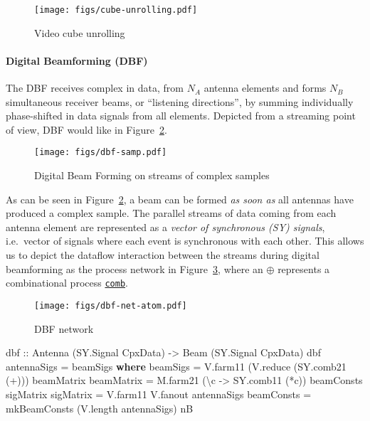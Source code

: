\documentclass[
  a4paper,
]{article}
\newenvironment{Shaded}{}{}
\newcommand{\DataTypeTok}[1]{\textcolor[rgb]{0.56,0.13,0.00}{#1}}
\newcommand{\FunctionTok}[1]{\textcolor[rgb]{0.02,0.16,0.49}{#1}}
\newcommand{\KeywordTok}[1]{\textcolor[rgb]{0.00,0.44,0.13}{\textbf{#1}}}
\newcommand{\NormalTok}[1]{#1}
\newcommand{\OtherTok}[1]{\textcolor[rgb]{0.00,0.44,0.13}{#1}}
\let\oldparagraph\paragraph
\renewcommand{\paragraph}[1]{\oldparagraph{#1}\mbox{}}
\begin{document}
\begin{figure}
\hypertarget{fig:cube-unrolling}{%
\centering
\texttt{[image: figs/cube-unrolling.pdf]}
\caption{Video cube unrolling}\label{fig:cube-unrolling}
}
\end{figure}

\hypertarget{sec:dbf-atom-net}{%
\paragraph{Digital Beamforming (DBF)}\label{sec:dbf-atom-net}}

The DBF receives complex in data, from \(N_A\) antenna elements and
forms \(N_B\) simultaneous receiver beams, or ``listening directions'',
by summing individually phase-shifted in data signals from all elements.
Depicted from a streaming point of view, DBF would like in
Figure~\ref{fig:dbf-samp}.

\begin{figure}
\hypertarget{fig:dbf-samp}{%
\centering
\texttt{[image: figs/dbf-samp.pdf]}
\caption{Digital Beam Forming on streams of complex
samples}\label{fig:dbf-samp}
}
\end{figure}

As can be seen in Figure~\ref{fig:dbf-samp}, a beam can be formed
\emph{as soon as} all antennas have produced a complex sample. The
parallel streams of data coming from each antenna element are
represented as a \emph{vector of synchronous (SY) signals}, i.e.~vector
of signals where each event is synchronous with each other. This allows
us to depict the dataflow interaction between the streams during digital
beamforming as the process network in Figure~\ref{fig:dbf-net-atom},
where an \(\oplus\) represents a combinational process
\href{https://forsyde.github.io/forsyde-atom/api/ForSyDe-Atom-MoC.html\#v:comb22}{\texttt{comb}}.

\begin{figure}
\hypertarget{fig:dbf-net-atom}{%
\centering
\texttt{[image: figs/dbf-net-atom.pdf]}
\caption{DBF network}\label{fig:dbf-net-atom}
}
\end{figure}

\begin{Shaded}
\begin{Highlighting}[numbers=left,,firstnumber=153,]
\OtherTok{dbf ::} \DataTypeTok{Antenna}\NormalTok{ (}\DataTypeTok{SY.Signal} \DataTypeTok{CpxData}\NormalTok{)}
    \OtherTok{->} \DataTypeTok{Beam}\NormalTok{    (}\DataTypeTok{SY.Signal} \DataTypeTok{CpxData}\NormalTok{)}
\NormalTok{dbf antennaSigs }\FunctionTok{=}\NormalTok{ beamSigs}
  \KeywordTok{where}
\NormalTok{    beamSigs   }\FunctionTok{=}\NormalTok{ V.farm11 (V.reduce (SY.comb21 (}\FunctionTok{+}\NormalTok{))) beamMatrix}
\NormalTok{    beamMatrix }\FunctionTok{=}\NormalTok{ M.farm21 (\textbackslash{}c }\OtherTok{->}\NormalTok{ SY.comb11 (}\FunctionTok{*}\NormalTok{c)) beamConsts sigMatrix}
\NormalTok{    sigMatrix  }\FunctionTok{=}\NormalTok{ V.farm11 V.fanout antennaSigs}
\NormalTok{    beamConsts }\FunctionTok{=}\NormalTok{ mkBeamConsts (V.length antennaSigs) nB}
\end{Highlighting}
\end{Shaded}
\end{document}
